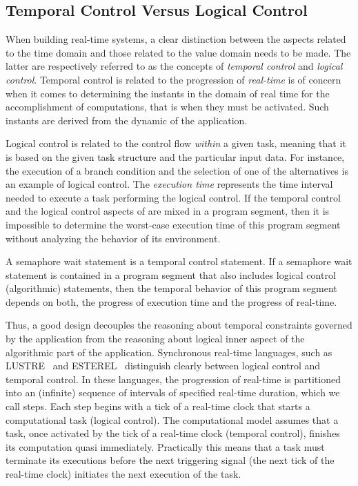 \subsection{Temporal Control Versus Logical Control}
When building real-time systems, a clear distinction between the aspects related to the time 
domain and those related to the value domain needs to be made. The latter are respectively
referred to as the concepts of \emph{temporal control} and \emph{logical control}.
Temporal control is related to the progression of \emph{real-time} is of concern when it comes 
to determining the instants in the domain of real time for the accomplishment of 
computations, that is when they must be activated.
Such instants are derived from the dynamic of the application. 

Logical control is related to the control flow \emph{within} a given task, meaning that it 
is based on the given task structure and the particular input data. For instance, the execution
of a branch condition and the selection of one of the alternatives is an example of logical
control. The \emph{execution time} represents the time interval needed to execute a task
performing the logical control.
If the temporal control and the logical control aspects of are mixed in a program segment,
then it is impossible to determine the worst-case execution time of this program segment without
analyzing the behavior of its environment.
\begin{example}\label{exp:control1}
 A semaphore wait statement is a temporal control statement. If a semaphore
wait statement is contained in a program segment that also includes logical control
(algorithmic) statements, then the temporal behavior of this program segment depends
on both, the progress of execution time and the progress of real-time.
\end{example}
Thus, a good design decouples the reasoning about temporal constraints governed by the 
application from the reasoning about logical inner aspect of the algorithmic part of the 
application.
Synchronous real-time languages, such as LUSTRE~\cite{intro:lustre} and 
ESTEREL~\cite{intro:esterel} distinguish clearly between logical control and temporal
control. In these languages, the progression of real-time is partitioned into an
(infinite) sequence of intervals of specified real-time duration, which we call
steps. Each step begins with a tick of a real-time clock that starts a computational
task (logical control). The computational model assumes that a task, once activated
by the tick of a real-time clock (temporal control), finishes its computation quasi
immediately. Practically this means that a task must terminate its executions before
the next triggering signal (the next tick of the real-time clock) initiates the next
execution of the task.

